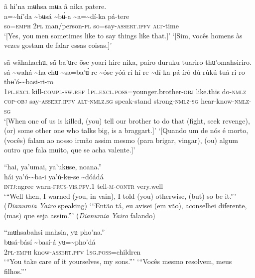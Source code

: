 \documentclass[output=paper,
modfonts,nonflat
]{langsci/langscibook}
\begin{document}
\ea ã hi'na mʉhsa mʉa ã nika patere. \\[.3em]
\gll {\textasciitilde}a={\textasciitilde}hí'da	{\textasciitilde}bʉsá	{\textasciitilde}bʉ́-a	{\textasciitilde}a={\textasciitilde}dí-ka	pá-tere \\
     so=\textsc{emph}	2\textsc{pl}	man/person-\textsc{pl}	so=say-\textsc{assert.ipfv}	\textsc{alt}-time\\
\glt ‘[Yes, you men sometimes like to say things like that.]’
\glt ‘[Sim, vocês homens às vezes gostam de falar essas coisas.]’
\z 

 
\ea sã wãhahachʉ, sã ba'ʉre õse yoari hire nika, pairo duruku tuariro thʉ'omahsiriro. \\[.3em]
\gll {\textasciitilde}sá {\textasciitilde}wahá-{\textasciitilde}ha-chʉ	{\textasciitilde}sa=ba'ʉ́-re	{\textasciitilde}óse	yóá-rí	hí-re {\textasciitilde}dí-ka	pá-író	dú-rúkú	tuá-ri-ro	thʉ'ó-{\textasciitilde}basi-ri-ro\\
     1\textsc{pl.excl} kill-\textsc{compl-sw.ref}	1\textsc{pl.excl.poss}=younger.brother\textsc{-obj}	like.this	do\textsc{-nmlz}	\textsc{cop-obj} say-\textsc{assert.ipfv}	\textsc{alt}\textsc{-nmlz.sg}	speak-stand	strong\textsc{-nmlz-sg}	hear-know\textsc{-nmlz-sg} \\
\glt ‘[When one of us is killed, (you) tell our brother to do that (fight, seek revenge), (or) some other one who talks big, is a braggart.]’
\newpage 
\glt ‘[Quando um de nós é morto, (vocês) falam ao nosso irmão assim mesmo (para brigar, vingar), (ou) algum outro que fala muito, que se acha valente.]’
\z

\ea “hai, ya'umai, ya'ukʉse, noana.” \\[.3em]
\gll hái	ya'ú-{\textasciitilde}ba-i	ya'ú-kʉ-se	{\textasciitilde}dóádá \\
     \textsc{intj:}agree	warn-\textsc{frus-vis.pfv.}1	tell-\textsc{m-contr}	very.well\\
\glt ‘“Well then, I warned (you, in vain), I told (you) otherwise, (but) so be it.”’ (\textit{Dianumia Yairo} speaking)
\glt ‘“Então tá, eu avisei (em vão), aconselhei diferente, (mas) que seja assim.”’ (\textit{Dianumia Yairo} falando)
\z 

\ea “mʉhsabahsi mahsia, yʉ pho'na.”  \\[.3em]
\gll {\textasciitilde}bʉsá-básí	{\textasciitilde}basí-á	yʉ={\textasciitilde}pho'dá \\
     2\textsc{pl-emph}	know-\textsc{assert.pfv}	1\textsc{sg.poss}=children \\
\glt ‘“You take care of it yourselves, my sons.”’
\glt ‘“Vocês mesmo resolvem, meus filhos.”’
\z 
\end{document}
